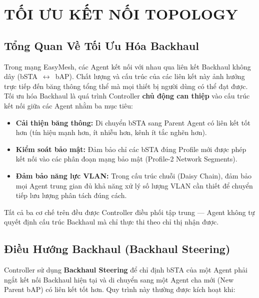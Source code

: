 \chapter{TỐI ƯU KẾT NỐI TOPOLOGY}
\label{chapter:chapter-8}

\section{Tổng Quan Về Tối Ưu Hóa Backhaul}

Trong mạng EasyMesh, các Agent kết nối với nhau qua liên kết Backhaul không dây
(bSTA~$\leftrightarrow$~bAP). Chất lượng và cấu trúc của các liên kết này ảnh hưởng
trực tiếp đến băng thông tổng thể mà mọi thiết bị người dùng có thể đạt được.
Tối ưu hóa Backhaul là quá trình Controller \textbf{chủ động can thiệp} vào cấu trúc
kết nối giữa các Agent nhằm ba mục tiêu:

\begin{itemize}
	\item \textbf{Cải thiện băng thông:} Di chuyển bSTA sang Parent Agent có liên kết
	tốt hơn (tín hiệu mạnh hơn, ít nhiễu hơn, kênh ít tắc nghẽn hơn).
	\item \textbf{Kiểm soát bảo mật:} Đảm bảo chỉ các bSTA đúng Profile mới được
	phép kết nối vào các phân đoạn mạng bảo mật (Profile-2 Network Segments).
	\item \textbf{Đảm bảo năng lực VLAN:} Trong cấu trúc chuỗi (Daisy Chain), đảm
	bảo mọi Agent trung gian đủ khả năng xử lý số lượng VLAN cần thiết để
	chuyển tiếp lưu lượng phân tách đúng cách.
\end{itemize}

Tất cả ba cơ chế trên đều được Controller điều phối tập trung --- Agent không tự quyết
định cấu trúc Backhaul mà chỉ thực thi theo chỉ thị nhận được.


\section{Điều Hướng Backhaul (Backhaul Steering)}

Controller sử dụng \textbf{Backhaul Steering} để chỉ định bSTA của một Agent phải
ngắt kết nối Backhaul hiện tại và di chuyển sang một Agent cha mới (New Parent bAP)
có liên kết tốt hơn. Quy trình này thường được kích hoạt khi:

